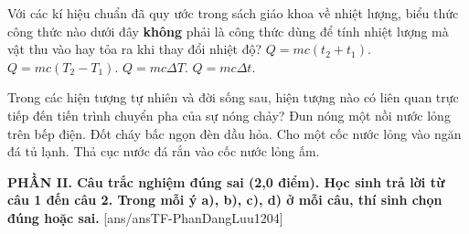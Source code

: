 \begin{ex}%
	Với các kí hiệu chuẩn đã quy ước trong sách giáo khoa về nhiệt lượng, biểu thức công thức nào dưới đây \textbf{không} phải là công thức dùng để tính nhiệt lượng mà vật thu vào hay tỏa ra khi thay đổi nhiệt độ?
	\choice
	{\True $Q=m c\left(t_{2}+t_{1}\right)$.}
	{$Q=m c\left(T_{2}-T_{1}\right)$.}
	{$Q=m c \Delta T$.}
	{$Q=m c \Delta t$.}
\end{ex}

\begin{ex}%
	Trong các hiện tượng tự nhiên và đời sống sau, hiện tượng nào có liên quan trực tiếp đến tiến trình chuyển pha của sự nóng chảy?
	\choice
	{Đun nóng một nồi nước lỏng trên bếp điện.}
	{Đốt cháy bấc ngọn đèn dầu hỏa.}
	{Cho một cốc nước lỏng vào ngăn đá tủ lạnh.}
	{\True Thả cục nước đá rắn vào cốc nước lỏng ấm.}
\end{ex}


\noindent \textbf{PHẦN II. Câu trắc nghiệm đúng sai (2,0 điểm). Học sinh trả lời từ câu 1 đến câu 2. Trong mỗi ý a), b), c), d) ở mỗi câu, thí sinh chọn đúng hoặc sai.}
[ans/ansTF-PhanDangLuu1204]


